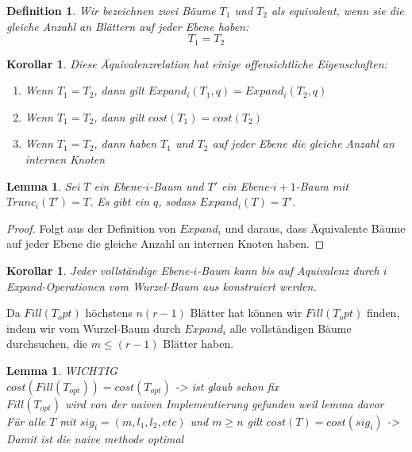 \documentclass[a4paper,10pt,ngerman]{scrartcl}
\newtheorem{definition}[satz]{Definition}
\newtheorem{lemma}[satz]{Lemma}
\newtheorem{korollar}[satz]{Korollar}
\begin{document}
    \begin{definition}
        Wir bezeichnen zwei Bäume $T_1$ und $T_2$ als equivalent, wenn sie die gleiche Anzahl an Blättern auf jeder Ebene haben:
        \[T_1 = T_2\]
    \end{definition}
    \begin{korollar}
        Diese Äquivalenzrelation hat einige offensichtliche Eigenschaften:
        \begin{enumerate}
            \item Wenn $T_1 = T_2$, dann gilt $Expand_i(T_1, q) = Expand_i(T_2, q)$
            \item Wenn $T_1 = T_2$, dann gilt $cost(T_1) = cost(T_2)$
            \item Wenn $T_1 = T_2$, dann haben $T_1$ und $T_2$ auf jeder Ebene die gleiche Anzahl an internen Knoten
        \end{enumerate}
    \end{korollar}
    \begin{lemma}
        Sei $T$ ein Ebene-$i$-Baum und $T'$ ein Ebene-$i+1$-Baum mit $Trunc_i(T') = T$.
        Es gibt ein $q$, sodass $Expand_i(T) = T'$.
    \end{lemma}
    \begin{proof}
        Folgt aus der Definition von $Expand_i$ und daraus, dass Äquivalente Bäume auf jeder Ebene die gleiche Anzahl an internen Knoten haben.
    \end{proof}
    \begin{korollar}
        Jeder vollständige Ebene-$i$-Baum kann bis auf Aquivalenz durch $i$ Expand-Operationen vom Wurzel-Baum aus konstruiert werden.
    \end{korollar}
    Da $Fill(T_opt)$ höchstens $n (r -1)$ Blätter hat können wir $Fill(T_opt)$ finden, indem wir vom Wurzel-Baum %
    durch $Expand_i$ alle vollständigen Bäume durchsuchen, die $m \le (r - 1)$ Blätter haben.

    \begin{lemma}

        WICHTIG \\
        $cost(Fill(T_{opt})) = cost(T_{opt})$ -> ist glaub schon fix \\
        $Fill(T_{opt})$ wird von der naiven Implementierung gefunden weil lemma davor\\
        Für alle $T$ mit $sig_i = (m, l_1, l_2, etc)$ und $m \ge n$ gilt $cost(T) = cost(sig_i)$
        -> Damit ist die naive methode optimal
    \end{lemma}
\end{document}
